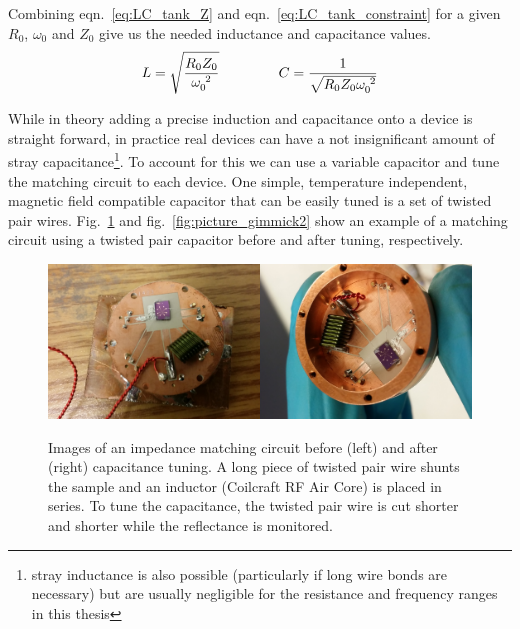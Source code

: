 Combining eqn.~\ref{eq:LC_tank_Z} and eqn.~\ref{eq:LC_tank_constraint} for a given $R_0$, $\omega_0$ and $Z_0$ give us the needed inductance and capacitance values.
\begin{equation}\label{eq:LC_tank_LC}
L = \sqrt{\frac{R_0Z_0}{\omega_0^{~2}}}
\hspace{15mm}
C = \frac{1}{\sqrt{R_0Z_0\omega_0^{~2}}}
\end{equation}

While in theory adding a precise induction and capacitance onto a device is straight forward, in practice real devices can have a not insignificant amount of stray capacitance\footnote{stray inductance is also possible (particularly if long wire bonds are necessary) but are usually negligible for the resistance and frequency ranges in this thesis}. To account for this we can use a variable capacitor and tune the matching circuit to each device. One simple, temperature independent, magnetic field compatible capacitor that can be easily tuned is a set of twisted pair wires. Fig.~\ref{fig:picture_gimmick1} and fig.~\ref{fig:picture_gimmick2} show an example of a matching circuit using a twisted pair capacitor before and after tuning, respectively.
\begin{figure}
\centering
\includegraphics[width=0.5\textwidth]{figures/Johnson_noise_thermometry/picture_gimmick1.jpg}\includegraphics[width=0.5\textwidth]{figures/Johnson_noise_thermometry/picture_gimmick2.jpg}
\caption{Images of an impedance matching circuit before (left) and after (right) capacitance tuning. A long piece of twisted pair wire shunts the sample and an inductor (Coilcraft RF Air Core) is placed in series. To tune the capacitance, the twisted pair wire is cut shorter and shorter while the reflectance is monitored.}
\label{fig:picture_gimmick1}
\end{figure} 

